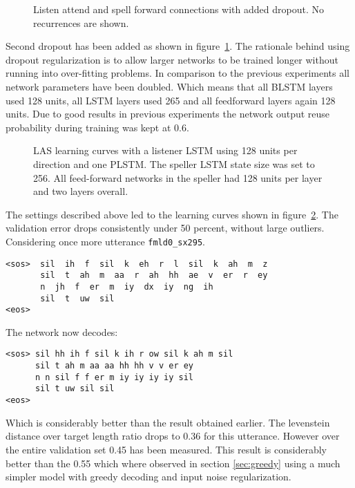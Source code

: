 \begin{figure}
\centering

\caption{Listen attend and spell forward connections with added dropout. No recurrences are shown.}
\label{fig:dropout}
\end{figure}
Second dropout has been added as shown in figure~\ref{fig:dropout}. The rationale behind using dropout regularization is to allow larger networks to be trained longer without running into over-fitting problems. In comparison to the previous experiments all network parameters have been doubled. Which means that all BLSTM layers used 128 units, all LSTM layers used 265 and all feedforward layers again 128 units. Due to good results in previous experiments the network output reuse probability during training was kept at 0.6. 
\begin{figure}


\caption{LAS learning curves with a listener LSTM using 128 units per direction and one PLSTM. The speller LSTM state size was set to 256. All feed-forward networks in the speller had 128 units per layer and two layers overall.}
\label{fig:dropBeamRes}
\end{figure}
The settings described above led to the learning curves shown in figure~\ref{fig:dropBeamRes}. The validation error drops consistently under 50 percent, without large outliers. Considering once more utterance \texttt{fmld0\_sx295}.
\begin{lstlisting}[caption={Targets}]
<sos>  sil  ih  f  sil  k  eh  r  l  sil  k  ah  m  z
       sil  t  ah  m  aa  r  ah  hh  ae  v  er  r  ey
       n  jh  f  er  m  iy  dx  iy  ng  ih  
       sil  t  uw  sil
<eos>
\end{lstlisting}
The network now decodes:
\begin{lstlisting}[caption={Network output}]
<sos> sil hh ih f sil k ih r ow sil k ah m sil 
	  sil t ah m aa aa hh hh v v er ey 
	  n n sil f f er m iy iy iy iy sil
	  sil t uw sil sil
<eos>
\end{lstlisting}
Which is considerably better than the result obtained earlier. The levenstein distance over target length ratio drops to 0.36 for this utterance. However over the entire validation set 0.45 has been measured. This result is considerably better than the 0.55 which where observed in section \ref{sec:greedy} using a much simpler model with greedy decoding and input noise regularization.  




